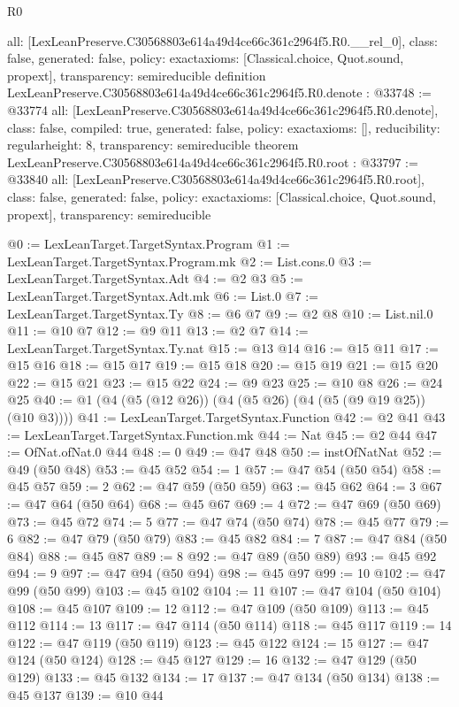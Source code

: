 \begin{lexlean}{R0}
\begin{coremodule}
{  all: [LexLeanPreserve.C30568803e614a49d4ce66c361c2964f5.R0.__rel_0],
  class: false,
  generated: false,
  policy: exact{axioms: [Classical.choice, Quot.sound, propext]},
  transparency: semireducible
}
definition LexLeanPreserve.C30568803e614a49d4ce66c361c2964f5.R0.denote : @33748 := @33774 {
  all: [LexLeanPreserve.C30568803e614a49d4ce66c361c2964f5.R0.denote],
  class: false,
  compiled: true,
  generated: false,
  policy: exact{axioms: []},
  reducibility: regular{height: 8},
  transparency: semireducible
}
theorem LexLeanPreserve.C30568803e614a49d4ce66c361c2964f5.R0.root : @33797 := @33840 {
  all: [LexLeanPreserve.C30568803e614a49d4ce66c361c2964f5.R0.root],
  class: false,
  generated: false,
  policy: exact{axioms: [Classical.choice, Quot.sound, propext]},
  transparency: semireducible
}

@0 := LexLeanTarget.TargetSyntax.Program
@1 := LexLeanTarget.TargetSyntax.Program.mk
@2 := List.cons.{0}
@3 := LexLeanTarget.TargetSyntax.Adt
@4 := @2 @3
@5 := LexLeanTarget.TargetSyntax.Adt.mk
@6 := List.{0}
@7 := LexLeanTarget.TargetSyntax.Ty
@8 := @6 @7
@9 := @2 @8
@10 := List.nil.{0}
@11 := @10 @7
@12 := @9 @11
@13 := @2 @7
@14 := LexLeanTarget.TargetSyntax.Ty.nat
@15 := @13 @14
@16 := @15 @11
@17 := @15 @16
@18 := @15 @17
@19 := @15 @18
@20 := @15 @19
@21 := @15 @20
@22 := @15 @21
@23 := @15 @22
@24 := @9 @23
@25 := @10 @8
@26 := @24 @25
@40 := @1 (@4 (@5 (@12 @26)) (@4 (@5 @26) (@4 (@5 (@9 @19 @25)) (@10 @3))))
@41 := LexLeanTarget.TargetSyntax.Function
@42 := @2 @41
@43 := LexLeanTarget.TargetSyntax.Function.mk
@44 := Nat
@45 := @2 @44
@47 := OfNat.ofNat.{0} @44
@48 := 0
@49 := @47 @48
@50 := instOfNatNat
@52 := @49 (@50 @48)
@53 := @45 @52
@54 := 1
@57 := @47 @54 (@50 @54)
@58 := @45 @57
@59 := 2
@62 := @47 @59 (@50 @59)
@63 := @45 @62
@64 := 3
@67 := @47 @64 (@50 @64)
@68 := @45 @67
@69 := 4
@72 := @47 @69 (@50 @69)
@73 := @45 @72
@74 := 5
@77 := @47 @74 (@50 @74)
@78 := @45 @77
@79 := 6
@82 := @47 @79 (@50 @79)
@83 := @45 @82
@84 := 7
@87 := @47 @84 (@50 @84)
@88 := @45 @87
@89 := 8
@92 := @47 @89 (@50 @89)
@93 := @45 @92
@94 := 9
@97 := @47 @94 (@50 @94)
@98 := @45 @97
@99 := 10
@102 := @47 @99 (@50 @99)
@103 := @45 @102
@104 := 11
@107 := @47 @104 (@50 @104)
@108 := @45 @107
@109 := 12
@112 := @47 @109 (@50 @109)
@113 := @45 @112
@114 := 13
@117 := @47 @114 (@50 @114)
@118 := @45 @117
@119 := 14
@122 := @47 @119 (@50 @119)
@123 := @45 @122
@124 := 15
@127 := @47 @124 (@50 @124)
@128 := @45 @127
@129 := 16
@132 := @47 @129 (@50 @129)
@133 := @45 @132
@134 := 17
@137 := @47 @134 (@50 @134)
@138 := @45 @137
@139 := @10 @44

\end{coremodule}
\end{lexlean}
